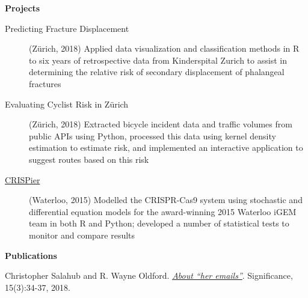 \documentclass[letterpaper,10pt]{article}
\makeatletter
\newcommand{\resheading}[1]{\colorbox{resBlue}{\begin{minipage}{\textwidth}
			\textbf{#1}
\end{minipage}} \vspace{-14pt}}
\newcommand{\resitem}[4]{\begin{tabular*}{17.5cm}{l@{\extracolsep{\fill}}r} \textbf{#1} & #2 \\ \textit{#3} & \textit{#4} \\ \end{tabular*} \vspace{-6pt}}
\makeatother
\begin{document}
\begin{itemize}
\begin{comment}
			\end{description}}
\item
	\resitem{\href{https://www.calgarystampede.com/}{The Calgary Stampede}}{Calgary, AB}{Parking Attendant}{July 2011, July 2012}
		{\footnotesize \begin{description}
				\item[Teamwork] Managed parking at a surface lot with a team during the annual Calgary Exhibition and Stampede
				\item[Customer Service] Engaged positively with customers and other employees, garnering the Golden Pylon Award for excellence in customer service both years employed
			\end{description}}
\end{comment}
\end{itemize}

\resheading{Projects}
\begin{description}\item[Predicting Fracture Displacement] (Z\"urich, 2018) {\footnotesize Applied data visualization and classification methods in R to six years of retrospective data from Kinderspital Zurich to assist in determining the relative risk of secondary displacement of phalangeal fractures}
\item[Evaluating Cyclist Risk in Z\"urich] (Z\"urich, 2018) {\footnotesize Extracted bicycle incident data and traffic volumes from public APIs using Python, processed this data using kernel density estimation to estimate risk, and implemented an interactive application to suggest routes based on this risk}
\item[\href{http://2015.igem.org/Team:Waterloo}{CRISPier}] (Waterloo, 2015) {\footnotesize Modelled the CRISPR-Cas9 system using stochastic and differential equation models for the award-winning 2015 Waterloo iGEM team in both R and Python; developed a number of statistical tests to monitor and compare results}
\end{description}

\resheading{Publications}
\begin{description}
	\item
	Christopher Salahub and R. Wayne Oldford. \href{https://rss.onlinelibrary.wiley.com/doi/full/10.1111/j.1740-9713.2018.01148.x}{\textit{About ``her emails''}}. Significance, 15(3):34-37, 2018. 
\end{description}
\end{document}
